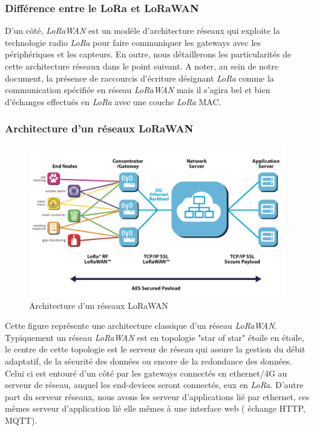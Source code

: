 \documentclass[11pt]{article}
\begin{document}
\subsubsection{Différence entre le LoRa et LoRaWAN}
D'un côté,  \textit{LoRaWAN} est un modèle d'architecture réseaux qui exploite la technologie radio \textit{LoRa} pour faire communiquer les gateways avec les périphériques et les capteurs. En outre, nous détaillerons les particularités de cette architecture réseaux dans le point suivant. A noter, au sein de notre document, la présence de raccourcis d'écriture désignant \textit{LoRa} comme la communication spécifiée en réseau  \textit{LoRaWAN} mais il s'agira bel et bien d'échanges effectués en \textit{LoRa} avec une couche \textit{LoRa} MAC. 
 
\subsubsection{Architecture d'un réseaux LoRaWAN}
\begin{figure}[h!]
\centering
\includegraphics[scale=0.6]{networkArch.png}
\caption{Architecture d'un réseaux LoRaWAN}
\end{figure}
Cette figure représente une architecture classique d'un réseau  \textit{LoRaWAN}. Typiquement un réseau  \textit{LoRaWAN} est en topologie "star of star" étoile en étoile, le centre de cette topologie est le serveur de réseau qui assure la gestion du débit adaptatif, de la sécurité des données ou encore de la redondance des données. Celui ci est entouré d'un côté par les gateways connectés en ethernet/4G au serveur de réseau, auquel les end-devices seront connectés, eux en \textit{LoRa}. D'autre part du serveur réseaux, nous avons les serveur d'applications lié par ethernet, ces mêmes serveur d'application lié elle mêmes à une interface web ( échange HTTP, MQTT).
\end{document}
